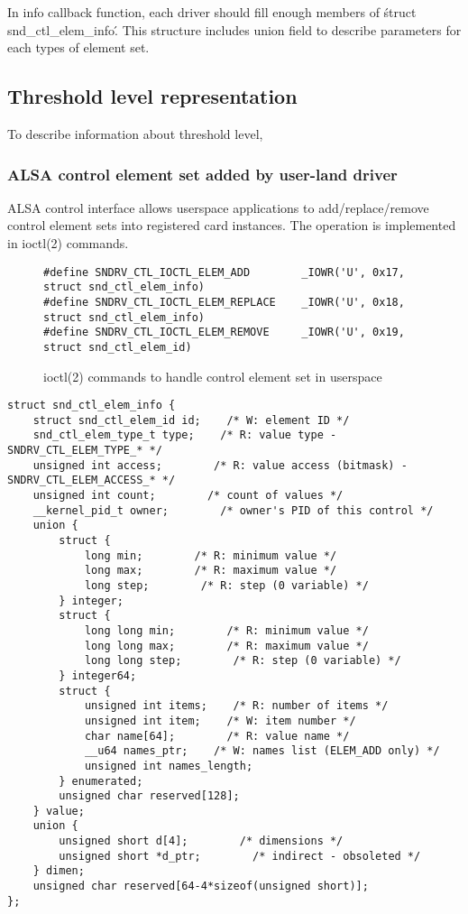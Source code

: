 \documentclass[onecolumn]{article}
\begin{document}
In info callback function, each driver should fill enough members of \'struct snd\_ctl\_elem\_info\'. This structure includes union field to describe parameters for each types of element set.

\subsection{Threshold level representation}

To describe information about threshold level, 


\subsubsection{ALSA control element set added by user-land driver}

ALSA control interface allows userspace applications to add/replace/remove control element sets into registered card instances. The operation is implemented in ioctl(2) commands.

\begin{figure}[htbp]
\small
\begin{verbatim}
#define SNDRV_CTL_IOCTL_ELEM_ADD        _IOWR('U', 0x17, struct snd_ctl_elem_info)
#define SNDRV_CTL_IOCTL_ELEM_REPLACE    _IOWR('U', 0x18, struct snd_ctl_elem_info)
#define SNDRV_CTL_IOCTL_ELEM_REMOVE     _IOWR('U', 0x19, struct snd_ctl_elem_id)
\end{verbatim}
\caption{{ioctl(2) commands to handle control element set in userspace}}
\label{ioctl-commands-userspace-element}
\end{figure}






\begin{verbatim}
struct snd_ctl_elem_info {
    struct snd_ctl_elem_id id;    /* W: element ID */
    snd_ctl_elem_type_t type;    /* R: value type - SNDRV_CTL_ELEM_TYPE_* */
    unsigned int access;        /* R: value access (bitmask) - SNDRV_CTL_ELEM_ACCESS_* */
    unsigned int count;        /* count of values */
    __kernel_pid_t owner;        /* owner's PID of this control */
    union {
        struct {
            long min;        /* R: minimum value */
            long max;        /* R: maximum value */
            long step;        /* R: step (0 variable) */
        } integer;
        struct {
            long long min;        /* R: minimum value */
            long long max;        /* R: maximum value */
            long long step;        /* R: step (0 variable) */
        } integer64;
        struct {
            unsigned int items;    /* R: number of items */
            unsigned int item;    /* W: item number */
            char name[64];        /* R: value name */
            __u64 names_ptr;    /* W: names list (ELEM_ADD only) */
            unsigned int names_length;
        } enumerated;
        unsigned char reserved[128];
    } value;
    union {
        unsigned short d[4];        /* dimensions */
        unsigned short *d_ptr;        /* indirect - obsoleted */
    } dimen;
    unsigned char reserved[64-4*sizeof(unsigned short)];
};
\end{verbatim}
\end{document}
